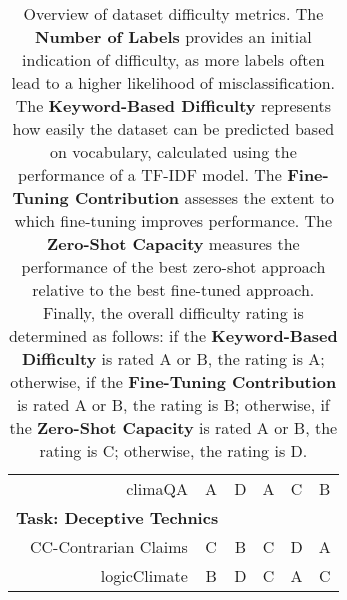 \begin{table}[ht]
\begin{tabular}{rcccc|c}
climaQA \cite{spokoyny2023answering} & A & D & A & C & B \\
\multicolumn{2}{l}{\textbf{Task: Deceptive Technics}} \\
\hline
CC-Contrarian Claims \cite{coanComputerassistedClassificationContrarian2021} & C & B & C & D & A \\
logicClimate \cite{jin-etal-2022-logical} & B & D & C & A & C \\
\end{tabular}
\caption{Overview of dataset difficulty metrics. The \textbf{Number of Labels} provides an initial indication of difficulty, as more labels often lead to a higher likelihood of misclassification. The \textbf{Keyword-Based Difficulty} represents how easily the dataset can be predicted based on vocabulary, calculated using the performance of a TF-IDF model. The \textbf{Fine-Tuning Contribution} assesses the extent to which fine-tuning improves performance. The \textbf{Zero-Shot Capacity} measures the performance of the best zero-shot approach relative to the best fine-tuned approach. Finally, the overall difficulty rating is determined as follows: if the \textbf{Keyword-Based Difficulty} is rated A or B, the rating is A; otherwise, if the \textbf{Fine-Tuning Contribution} is rated A or B, the rating is B; otherwise, if the \textbf{Zero-Shot Capacity} is rated A or B, the rating is C; otherwise, the rating is D.}
\label{tab:difficulty}
\end{table}

